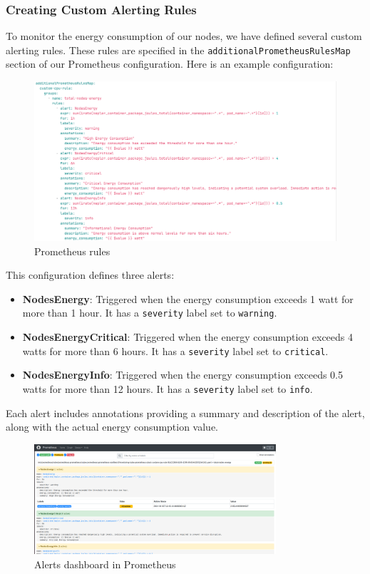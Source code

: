 \subsubsection{Creating Custom Alerting Rules}

To monitor the energy consumption of our nodes, we have defined several custom alerting rules. These rules are specified in the \texttt{additionalPrometheusRulesMap} section of our Prometheus configuration. Here is an example configuration:

\begin{figure}[H]
    \centering
    \includegraphics[width=16cm]{Figures/prometheus-rule.png}
    \caption{Prometheus rules}
\end{figure}

This configuration defines three alerts:

\begin{itemize}
  \item \textbf{NodesEnergy}: Triggered when the energy consumption exceeds 1 watt for more than 1 hour. It has a \texttt{severity} label set to \texttt{warning}.
  \item \textbf{NodesEnergyCritical}: Triggered when the energy consumption exceeds 4 watts for more than 6 hours. It has a \texttt{severity} label set to \texttt{critical}.
  \item \textbf{NodesEnergyInfo}: Triggered when the energy consumption exceeds 0.5 watts for more than 12 hours. It has a \texttt{severity} label set to \texttt{info}.
\end{itemize}

Each alert includes annotations providing a summary and description of the alert, along with the actual energy consumption value.

\begin{figure}[H]
  \centering
  \includegraphics[width=0.8\textwidth]{Figures/alerts.png}
  \caption{Alerts dashboard in Prometheus}
\end{figure}

